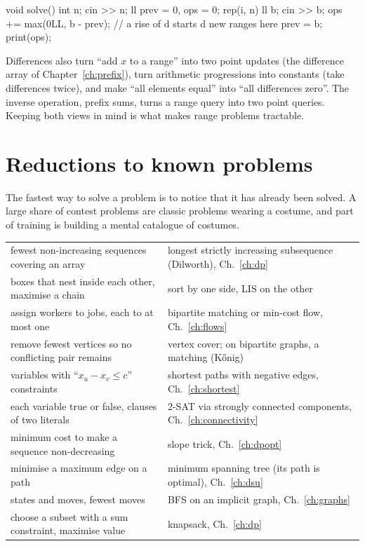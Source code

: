 \begin{code}
void solve() {
    int n;
    cin >> n;
    ll prev = 0, ops = 0;
    rep(i, n) {
        ll b;
        cin >> b;
        ops += max(0LL, b - prev);  // a rise of d starts d new ranges here
        prev = b;
    }
    print(ops);
}
\end{code}

Differences also turn ``add $x$ to a range'' into two point updates (the difference array of Chapter~\ref{ch:prefix}), turn
arithmetic progressions into constants (take differences twice), and make ``all elements equal'' into ``all differences
zero''. The inverse operation, prefix sums, turns a range query into two point queries. Keeping both views in mind is
what makes range problems tractable.

\section[Reductions to known problems]{Reductions to known problems \hfill \gold}\label{sec:reductions}

The fastest way to solve a problem is to notice that it has already been solved. A large share of contest problems are
classic problems wearing a costume, and part of training is building a mental catalogue of costumes.

\begin{center}
\small
\begin{tabularx}{\linewidth}{Lp{6.2cm}}
\toprule
{} &  \\
\midrule
fewest non-increasing sequences covering an array & longest strictly increasing subsequence (Dilworth), Ch.~\ref{ch:dp} \\
boxes that nest inside each other, maximise a chain & sort by one side, LIS on the other \\
assign workers to jobs, each to at most one & bipartite matching or min-cost flow, Ch.~\ref{ch:flows} \\
remove fewest vertices so no conflicting pair remains & vertex cover; on bipartite graphs, a matching (K\H{o}nig) \\
variables with ``$x_u - x_v \le c$'' constraints & shortest paths with negative edges, Ch.~\ref{ch:shortest} \\
each variable true or false, clauses of two literals & 2-SAT via strongly connected components, Ch.~\ref{ch:connectivity} \\
minimum cost to make a sequence non-decreasing & slope trick, Ch.~\ref{ch:dpopt} \\
minimise a maximum edge on a path & minimum spanning tree (its path is optimal), Ch.~\ref{ch:dsu} \\
states and moves, fewest moves & BFS on an implicit graph, Ch.~\ref{ch:graphs} \\
choose a subset with a sum constraint, maximise value & knapsack, Ch.~\ref{ch:dp} \\
\bottomrule
\end{tabularx}
\end{center}

